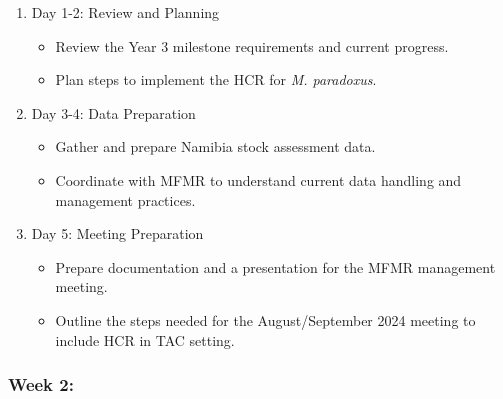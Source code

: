 \documentclass[
  letterpaper,
  DIV=11,
  numbers=noendperiod]{scrartcl}
\providecommand{\tightlist}{%
  \setlength{\itemsep}{0pt}\setlength{\parskip}{0pt}}\usepackage{longtable,booktabs,array}
\begin{document}
\begin{enumerate}
\def\labelenumi{\arabic{enumi}.}
\tightlist
\item
  Day 1-2: Review and Planning

  \begin{itemize}
  \tightlist
  \item
    Review the Year 3 milestone requirements and current progress.
  \item
    Plan steps to implement the HCR for \emph{M. paradoxus}.
  \end{itemize}
\item
  Day 3-4: Data Preparation

  \begin{itemize}
  \tightlist
  \item
    Gather and prepare Namibia stock assessment data.
  \item
    Coordinate with MFMR to understand current data handling and
    management practices.
  \end{itemize}
\item
  Day 5: Meeting Preparation

  \begin{itemize}
  \tightlist
  \item
    Prepare documentation and a presentation for the MFMR management
    meeting.
  \item
    Outline the steps needed for the August/September 2024 meeting to
    include HCR in TAC setting.
  \end{itemize}
\end{enumerate}

\subsubsection{Week 2:}\label{week-2}
\end{document}
